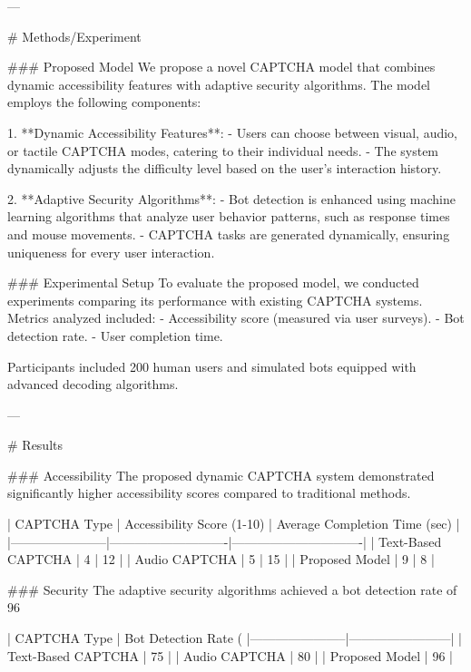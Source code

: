 ---

# Methods/Experiment  

### Proposed Model  
We propose a novel CAPTCHA model that combines dynamic accessibility features with adaptive security algorithms. The model employs the following components:  

1. **Dynamic Accessibility Features**:  
   - Users can choose between visual, audio, or tactile CAPTCHA modes, catering to their individual needs.  
   - The system dynamically adjusts the difficulty level based on the user's interaction history.  

2. **Adaptive Security Algorithms**:  
   - Bot detection is enhanced using machine learning algorithms that analyze user behavior patterns, such as response times and mouse movements.  
   - CAPTCHA tasks are generated dynamically, ensuring uniqueness for every user interaction.  

### Experimental Setup  
To evaluate the proposed model, we conducted experiments comparing its performance with existing CAPTCHA systems. Metrics analyzed included:  
- Accessibility score (measured via user surveys).  
- Bot detection rate.  
- User completion time.  

Participants included 200 human users and simulated bots equipped with advanced decoding algorithms.  

---

# Results  

### Accessibility  
The proposed dynamic CAPTCHA system demonstrated significantly higher accessibility scores compared to traditional methods.  

| CAPTCHA Type          | Accessibility Score (1-10) | Average Completion Time (sec) |  
|-----------------------|----------------------------|-------------------------------|  
| Text-Based CAPTCHA    | 4                          | 12                            |  
| Audio CAPTCHA         | 5                          | 15                            |  
| Proposed Model        | 9                          | 8                             |  

### Security  
The adaptive security algorithms achieved a bot detection rate of 96%

| CAPTCHA Type          | Bot Detection Rate (%
|-----------------------|------------------------|  
| Text-Based CAPTCHA    | 75                     |  
| Audio CAPTCHA         | 80                     |  
| Proposed Model        | 96                     |  

